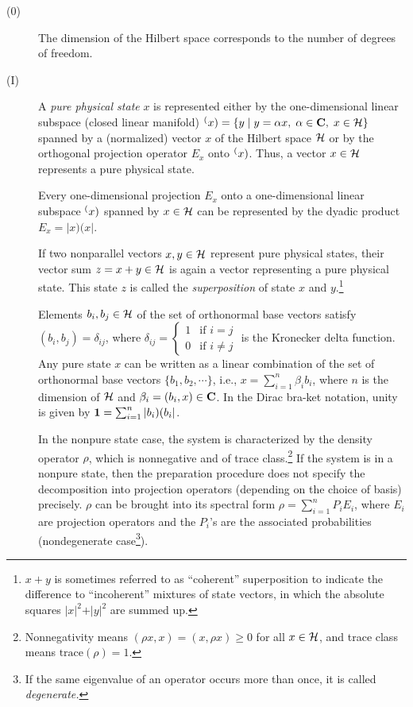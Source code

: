\documentclass [11pt]{llncs}
\begin{document}
\begin{description}
\item[(0)]
The dimension of the Hilbert space
corresponds to
the number of degrees of freedom.
\item[(I)]
A {\em pure physical state} $x$ is represented
either by the
one-dimensional linear subspace (closed linear manifold)
$\sp (x)=\{y\mid y=\alpha x,\; \alpha \in {\bf C},\; x\in {\cal H}\}$
spanned by a
(normalized)
vector $x$   of  the Hilbert space ${\cal H} $ or by the orthogonal
projection operator $E_x$ onto $\sp (x)$.
Thus, a vector $x\in {\cal H}$ represents a pure physical state.

Every one-dimensional projection $E_x$ onto a one-dimensional
linear subspace
 $\sp (x)$ spanned by $x\in {\cal H}$ can be
represented by the dyadic product
$E_x = \vert x)(x\vert$.

If two nonparallel vectors $x,y\in {\cal H}$ represent
pure physical states, their vector sum
$z=x+y\in{\cal H}$ is again a vector representing a pure physical
state.
This state $z$ is called the {\em superposition} of state $x$
and $y$.\footnote{
$x+y$ is sometimes referred to as ``coherent''
superposition to indicate the difference to ``incoherent'' mixtures of
state vectors, in which
the absolute squares $\vert x\vert^2 +\vert y\vert^2$
are
summed up.}


Elements $b_i,b_j\in {\cal H}$ of the set of orthonormal base vectors
satisfy
$(b_i, b_j) =\delta_{ij}$,
where $\delta_{ij}=
\left\{
\begin{array}{cc}
1&\textrm{if }i=j\\
0&\textrm{if }i\neq j
\end{array}
\right.$
is the Kronecker delta function.
Any pure state $x$ can be written as a linear
combination of
the set of orthonormal base vectors $\{b_1,b_2,\cdots \}$,
i.e.,
$x =\sum_{i=1}^n   \beta_i b_i$, where $n$ is the dimension of ${\cal
H}$ and
$\beta_i=(b_i,x) \in {\bf C}$.
In the Dirac bra-ket notation, unity is given by
${\bf 1}=\sum_{i=1}^n \vert b_i )( b_i\vert $.


In the nonpure state case, the system is characterized by the density
operator $\rho$, which is nonnegative and of trace class.\footnote{
Nonnegativity means $(\rho x,x)=(x,\rho x)\ge 0$ for all $x\in {\cal
H}$, and trace class means
$\textrm{trace}(\rho )=1$.}
If the system is in a nonpure state, then the preparation procedure
does not specify
the decomposition into projection operators (depending on the choice of basis)
precisely.
$\rho$ can be brought into its spectral form
$\rho =\sum_{i=1}^n P_i E_i$, where $E_i$ are projection operators and
the
$P_i$'s are the associated probabilities
 (nondegenerate
case\footnote{If the same eigenvalue of an operator
occurs more than once, it is called {\em degenerate.}}).


\end{description}
\end{document}
